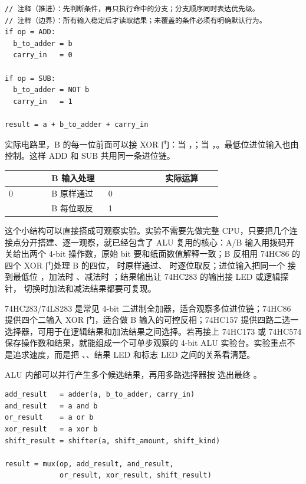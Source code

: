 \begin{lstlisting}
// 注释（推进）：先判断条件，再只执行命中的分支；分支顺序同时表达优先级。
// 注释（边界）：所有输入稳定后才读取结果；未覆盖的条件必须有明确默认行为。
if op = ADD:
  b_to_adder = b
  carry_in   = 0

if op = SUB:
  b_to_adder = NOT b
  carry_in   = 1

result = a + b_to_adder + carry_in
\end{lstlisting}

实际电路里，B 的每一位前面可以接 XOR 门：当 ，；当 ，。最低位进位输入也由  控制。这样 ADD 和 SUB 共用同一条进位链。

\begin{longtable}{L{0.18\linewidth}L{0.24\linewidth}L{0.24\linewidth}L{0.24\linewidth}}
\toprule
{} & B 输入处理 &  & 实际运算 \\
 & B 原样通过 & 0 &  \\ & B 每位取反 & 1 &  \\
\bottomrule
\end{longtable}

这个小结构可以直接搭成可观察实验。实验不需要先做完整 CPU，只要把几个连接点分开搭建、逐一观察，就已经包含了 ALU 复用的核心：A/B 输入用拨码开关给出两个 4-bit 操作数，原始 bit 要和纸面数值解释一致；B 反相用 74HC86 的四个 XOR 门处理 B 的四位， 时原样通过、 时逐位取反；进位输入把同一个  接到最低位 ，加法时 、减法时 ；结果输出让 74HC283 的输出接 LED 或逻辑探针， 切换时加法和减法结果都要可复现。

\begin{chipcase}
74HC283/74LS283 是常见 4-bit 二进制全加器，适合观察多位进位链；74HC86 提供四个二输入 XOR 门，适合做 B 输入的可控反相；74HC157 提供四路二选一选择器，可用于在逻辑结果和加法结果之间选择。若再接上 74HC173 或 74HC574 保存操作数和结果，就能组成一个可单步观察的 4-bit ALU 实验台。实验重点不是追求速度，而是把 、、结果 LED 和标志 LED 之间的关系看清楚。
\end{chipcase}

ALU 内部可以并行产生多个候选结果，再用多路选择器按  选出最终 。

\begin{lstlisting}
add_result   = adder(a, b_to_adder, carry_in)
and_result   = a and b
or_result    = a or b
xor_result   = a xor b
shift_result = shifter(a, shift_amount, shift_kind)

result = mux(op, add_result, and_result,
             or_result, xor_result, shift_result)
\end{lstlisting}

